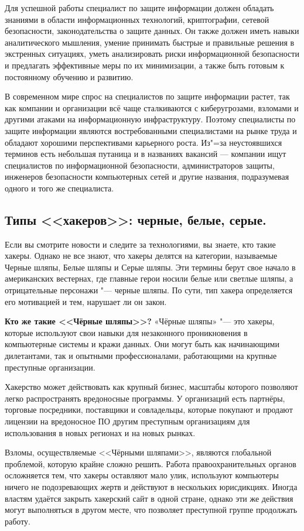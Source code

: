 Для успешной работы специалист по защите информации должен обладать знаниями в области информационных технологий, 
криптографии, сетевой безопасности, законодательства о защите данных. Он также должен иметь навыки аналитического мышления, 
умение принимать быстрые и правильные решения в экстренных ситуациях, уметь анализировать риски информационной безопасности и 
предлагать эффективные меры по их минимизации, а также быть готовым к постоянному обучению и развитию.

В современном мире спрос на специалистов по защите информации растет, так как компании и организации всё чаще сталкиваются с 
киберугрозами, взломами и другими атаками на информационную инфраструктуру. Поэтому специалисты по защите информации являются 
востребованными специалистами на рынке труда и обладают хорошими перспективами карьерного роста.
Из"=за неустоявшихся терминов есть небольшая путаница и в названиях вакансий — компании ищут специалистов по информационной 
безопасности, администраторов защиты, инженеров безопасности компьютерных сетей и другие названия, подразумевая одного и того 
же специалиста.
\newpage
\subsection{Типы <<хакеров>>: черные, белые, серые.}
Если вы смотрите новости и следите за технологиями, вы знаете, кто такие хакеры. Однако не все знают, что хакеры делятся на категории, называемые Черные шляпы, Белые шляпы и Серые шляпы. Эти термины берут свое начало в американских вестернах, где главные герои носили белые или светлые шляпы, а отрицательные персонажи "---  черные шляпы.
По сути, тип хакера определяется его мотивацией и тем, нарушает ли он закон.

\textbf{Кто же такие <<Чёрные шляпы>>?}
«Чёрные шляпы» "---  это хакеры, которые используют свои навыки для незаконного проникновения в компьютерные системы и кражи данных. Они могут быть как начинающими дилетантами, так и опытными профессионалами, работающими на крупные преступные организации.

Хакерство может действовать как крупный бизнес, масштабы которого позволяют легко распространять вредоносные программы. У организаций есть партнёры, торговые посредники, поставщики и совладельцы, которые покупают и продают лицензии на вредоносное ПО другим преступным организациям для использования в новых регионах и на новых рынках.

Взломы, осуществляемые <<Чёрными шляпами>>, являются глобальной проблемой, которую крайне сложно решить. Работа 
правоохранительных органов осложняется тем, что хакеры оставляют мало улик, используют компьютеры ничего не подозревающих 
жертв и действуют в нескольких юрисдикциях. Иногда властям удаётся закрыть хакерский сайт в одной стране, однако эти же 
действия могут выполняться в другом месте, что позволяет преступной группе продолжать работу.

